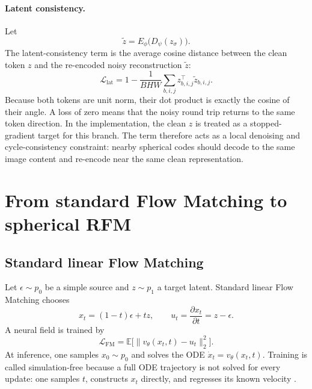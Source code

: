 \documentclass{article}
\begin{document}
\paragraph{Latent consistency.}
Let
\begin{equation}
 \tilde z=E_\phi\big(D_\psi(z_\sigma)\big).
\end{equation}
The latent-consistency term is the average cosine distance between the clean token $z$ and the re-encoded noisy reconstruction $\tilde z$:
\begin{equation}
 \mathcal L_{\mathrm{lat}}
 =1-\frac{1}{BHW}\sum_{b,i,j}z_{b,i,j}^{\top}\tilde z_{b,i,j}.
\end{equation}
Because both tokens are unit norm, their dot product is exactly the cosine of their angle. A loss of zero means that the noisy round trip returns to the same token direction. In the implementation, the clean $z$ is treated as a stopped-gradient target for this branch. The term therefore acts as a local denoising and cycle-consistency constraint: nearby spherical codes should decode to the same image content and re-encode near the same clean representation.

\section{From standard Flow Matching to spherical RFM}
\label{app:fm}
\subsection{Standard linear Flow Matching}
Let $\epsilon\sim p_0$ be a simple source and $z\sim p_1$ a target latent. Standard linear Flow Matching chooses
\begin{equation}
 x_t=(1-t)\epsilon+tz,\qquad
 u_t=\frac{\partial x_t}{\partial t}=z-\epsilon.
\end{equation}
A neural field is trained by
\begin{equation}
 \mathcal L_{\mathrm{FM}}
 =\mathbb E\big[\|v_\theta(x_t,t)-u_t\|_2^2\big].
\end{equation}
At inference, one samples $x_0\sim p_0$ and solves the ODE $\dot x_t=v_\theta(x_t,t)$. Training is called simulation-free because a full ODE trajectory is not solved for every update: one samples $t$, constructs $x_t$ directly, and regresses its known velocity \cite{fm}.
\end{document}
